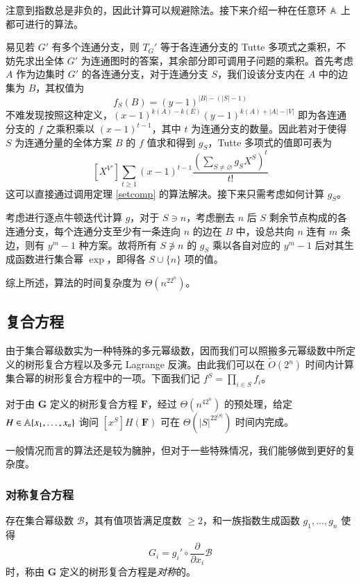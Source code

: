 注意到指数总是非负的，因此计算可以规避除法。接下来介绍一种在任意环 $\mathbb A$ 上都可进行的算法。

易见若 $G'$ 有多个连通分支，则 $T_G'$ 等于各连通分支的 Tutte 多项式之乘积，不妨先求出全体 $G'$ 为连通图时的答案，其余部分即可调用子问题的乘积。首先考虑 $A$ 作为边集时 $G'$ 的各连通分支，对于连通分支 $S$，我们设该分支内在 $A$ 中的边集为 $B$，其权值为
$$
f_S(B)=(y-1)^{|B|-(|S|-1)}
$$
不难发现按照这种定义，$(x-1)^{k(A)-k(E)}(y-1)^{k(A)+|A|-|V|}$ 即为各连通分支的 $f$ 之乘积乘以 $(x-1)^{t-1}$，其中 $t$ 为连通分支的数量。因此若对于使得 $S$ 为连通分量的全体方案 $B$ 的 $f$ 值求和得到 $g_S$，Tutte 多项式的值即可表为
$$
[X^{V'}] \sum_{t\ge 1} (x-1)^{t-1}\frac{\left( \sum_{S\neq \varnothing} g_S X^S \right)^t}{t!}
$$
这可以直接通过调用定理 \ref{setcomp} 的算法解决。接下来只需考虑如何计算 $g_S$。

考虑进行逐点牛顿迭代计算 $g$，对于 $S\ni n$，考虑删去 $n$ 后 $S$ 剩余节点构成的各连通分支，每个连通分支至少有一条连向 $n$ 的边在 $B$ 中，设总共向 $n$ 连有 $m$ 条边，则有 $y^m-1$ 种方案。故将所有 $S\not \ni n$ 的 $g_S$ 乘以各自对应的 $y^m-1$ 后对其生成函数进行集合幂 $\exp$，即得各 $S\cup \{n\}$ 项的值。

综上所述，算法的时间复杂度为 $\Theta(n^22^n)$。

\subsection{复合方程}

由于集合幂级数实为一种特殊的多元幂级数，因而我们可以照搬多元幂级数中所定义的树形复合方程以及多元 Lagrange 反演。由此我们可以在 $\tilde O(2^n)$ 时间内计算集合幂的树形复合方程中的一项。下面我们记 $f^S = \prod_{i\in S} f_i$。

\begin{theorem} \label{algocomp}
对于由 $\mathbf G$ 定义的树形复合方程 $\mathbf F$，经过 $\Theta(n^42^n)$ 的预处理，给定 $H \in \mathbb A\{x_1,\dots,x_n\}$ 询问 $[x^S] H(\mathbf F)$ 可在 $\Theta(|S|^22^{|S|})$ 时间内完成。
\end{theorem}

一般情况而言的算法还是较为臃肿，但对于一些特殊情况，我们能够做到更好的复杂度。

\subsubsection{对称复合方程}

\begin{definition}[对称复合方程]
存在集合幂级数 $\mathscr B$，其有值项皆满足度数 $\ge 2$，和一族指数生成函数 $g_1,\dots,g_n$ 使得
$$
G_i=g_i'\circ \frac{\partial}{\partial x_i} \mathscr B
$$
时，称由 $\mathbf G$ 定义的树形复合方程是\emph{对称}的。
\end{definition}

